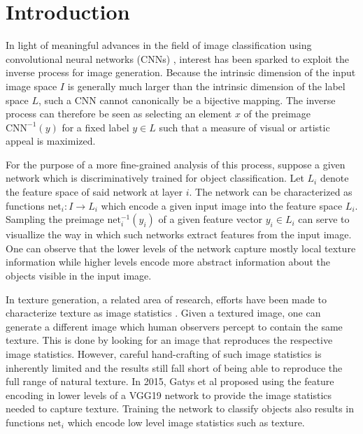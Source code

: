 
\section{Introduction}
\label{section:introduction}


In light of meaningful advances in the field of image classification using convolutional neural networks (CNNs) \cite{vgg2014}, interest has been sparked to exploit the inverse process for image generation. Because the intrinsic dimension of the input image space \(I\) is generally much larger than the intrinsic dimension of the label space \(L\), such a CNN cannot canonically be a bijective mapping. The inverse process can therefore be seen as selecting an element \(x\) of the preimage \(\mathrm{CNN}^{-1}(y)\) for a fixed label \(y\in L\) such that a measure of visual or artistic appeal is maximized.

For the purpose of a more fine-grained analysis of this process, suppose a given network which is discriminatively trained for object classification. Let \(L_i\) denote the feature space of said network at layer \(i\). The network can be characterized as functions \(\text{net}_i\colon I \to L_i\) which encode a given input image into the feature space \(L_i\). Sampling the preimage \(\text{net}_i^{-1}(y_i)\) of a given feature vector \(y_i\in L_i\) can serve to visuallize the way in which such networks extract features from the input image. One can observe that the lower levels of the network capture mostly local texture information while higher levels encode more abstract information about the objects visible in the input image.


In texture generation, a related area of research, efforts have been made to characterize texture as image statistics \cite{julesz1962visual,heeger1995pyramid,rosenholtz2012summary}. Given a textured image, one can generate a different image which human observers percept to contain the same texture. This is done by looking for an image that reproduces the respective image statistics. However, careful hand-crafting of such image statistics is inherently limited and the results still fall short of being able to reproduce the full range of natural texture. In 2015, Gatys et al \cite{gatys2015texture} proposed using the feature encoding in lower levels of a VGG19 network \cite{vgg2014} to provide the image statistics needed to capture texture. Training the network to classify objects also results in functions \(\text{net}_i\) which encode low level image statistics such as texture. 

